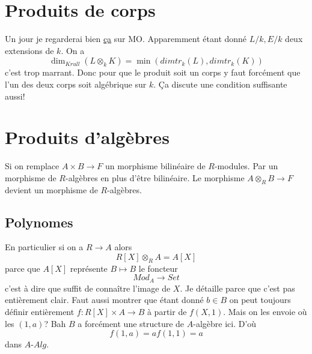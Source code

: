\documentclass[a4paper,12pt]{article}
\theoremstyle{plain}
\theoremstyle{definition}
\theoremstyle{remark}
\begin{document}
\section{Produits de corps}
Un jour je regarderai bien  
\href{https://mathoverflow.net/questions/82083/when-is-the-tensor-product-of-two-fields-a-field}{ça} sur MO.
Apparemment étant donné $L/k, E/k$ deux extensions de $k$. On a
\[\dim_{Krull}(L\otimes_k K)=\min(dimtr_k(L),dimtr_k(K))\]
c'est trop marrant. Donc pour que le produit soit un corps
y faut forcément que l'un des deux corps soit algébrique sur $k$.
Ça discute une condition suffisante aussi!

\section{Produits d'algèbres}
Si on remplace $A\times B\to F$ un morphisme bilinéaire de 
$R$-modules. Par un morphisme de $R$-algèbres en plus d'être 
bilinéaire. Le morphisme $A\otimes_R B\to F$ devient un morphisme
de $R$-algèbres.
\subsection{Polynomes}
En particulier si on a $R\to A$ alors
\[R[X]\otimes_R A=A[X]\]
parce que $A[X]$ représente $B\mapsto B$ le foncteur 
\[Mod_A\to Set\]
c'est à dire que suffit de connaître l'image de $X$. 
Je détaille parce que c'est pas entièrement clair.
Faut aussi montrer que étant donné $b\in B$ on peut
toujours définir entièrement $f\colon R[X]\times A\to B$ 
à partir de $f(X,1)$. Mais on les envoie où les
$(1,a)$? Bah $B$ a forcément une structure de $A$-algèbre
ici. D'où 
\[f(1,a)=af(1,1)=a\]
dans $A$-$Alg$.
\end{document}
